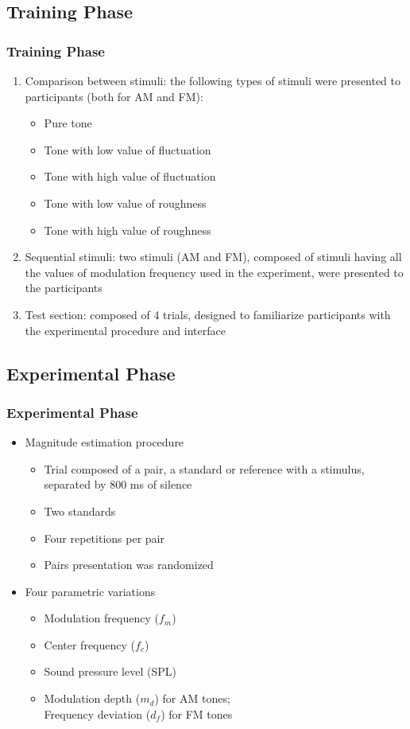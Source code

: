 \documentclass{beamer}
\begin{document}
\subsection{Training Phase}
\begin{frame}
  \frametitle{Training Phase}
  \begin{enumerate}
    \item Comparison between stimuli: the following types of stimuli were
      presented to participants (both for AM and FM):
      \begin{itemize}
        \item Pure tone
        \item Tone with low value of fluctuation
        \item Tone with high value of fluctuation
        \item Tone with low value of roughness
        \item Tone with high value of roughness
      \end{itemize}
    \pause{}
    \item Sequential stimuli: two stimuli (AM and FM), composed of stimuli
      having all the values of modulation frequency used in the experiment, were
      presented to the participants
    \pause{}
    \item Test section: composed of 4 trials, designed to familiarize
      participants with the experimental procedure and interface
  \end{enumerate}
\end{frame}

\subsection{Experimental Phase}
\begin{frame}
  \frametitle{Experimental Phase}
  \begin{itemize}
    \item Magnitude estimation procedure
    \begin{itemize}
      \item Trial composed of a pair, a standard or reference with a stimulus,
        separated by 800 ms of silence
      \item Two standards
      \item Four repetitions per pair
      \item Pairs presentation was randomized
    \end{itemize}
    \pause{}
    \item Four parametric variations
    \begin{itemize}
      \item Modulation frequency ($f_m$)
      \item Center frequency ($f_c$)
      \item Sound pressure level (SPL)
      \item Modulation depth ($m_d$) for AM tones;\\Frequency deviation ($d_f$)
        for FM tones
    \end{itemize}
  \end{itemize}
\end{frame}
\end{document}
